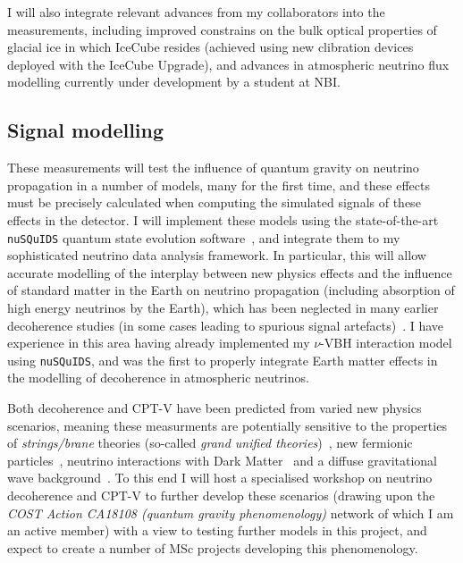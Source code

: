 \documentclass[a4paper,11pt]{article}
\begin{document}
I will also integrate relevant advances from my collaborators into the measurements, including improved constrains on the bulk optical properties of glacial ice in which IceCube resides (achieved using new clibration devices deployed with the IceCube Upgrade), and advances in atmospheric neutrino flux modelling currently under development by a student at NBI. \\


\subsection{Signal modelling}

These measurements will test the influence of quantum gravity on neutrino propagation in a number of models, many for the first time, and these effects must be precisely calculated when computing the simulated signals of these effects in the detector. I will implement these models using the state-of-the-art \texttt{nuSQuIDS} quantum state evolution software~\cite{Delgado:2014kpa, nusquidsGIT}, and integrate them to my sophisticated neutrino data analysis framework. In particular, this will allow accurate modelling of the interplay between new physics effects and the influence of standard matter in the Earth on neutrino propagation (including absorption of high energy neutrinos by the Earth), which has been neglected in many earlier decoherence studies (in some cases leading to spurious signal artefacts)~\cite{PhysRevD.97.115017}. I have experience in this area having already implemented my $\nu$-VBH interaction model using \texttt{nuSQuIDS}, and was the first to properly integrate Earth matter effects in the modelling of decoherence in atmospheric neutrinos.

Both decoherence and CPT-V have been predicted from varied new physics scenarios, meaning these measurments are potentially sensitive to the properties of \textit{strings/brane} theories (so-called \textit{grand unified theories})~\cite{Mavromatos2010, AmelinoCamelia:2008qg}, new fermionic particles~\cite{Hellmann:2021jyz}, neutrino interactions with Dark Matter~\cite{1909.11271, EPJC802020} and a diffuse gravitational wave background~\cite{PhysRevD.100.096014}.  To this end I will host a specialised workshop on neutrino decoherence and CPT-V to further develop these scenarios (drawing upon the \textit{COST Action CA18108 (quantum gravity phenomenology)} network of which I am an active member) with a view to testing further models in this project, and expect to create a number of MSc projects developing this phenomenology.
\end{document}
